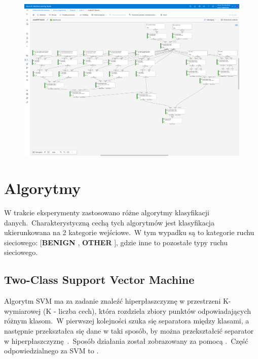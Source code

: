 \begin{landscape}
    \centering
\begin{figure}[H]
    \centering
    \includegraphics[height=0.9\textwidth]{images/pipeline}
    \label{fig:pipeline}
\end{figure}
\end{landscape}

\section{Algorytmy}
\label{sec:alg}
W trakcie eksperymenty zastosowano różne algorytmy klasyfikacji danych.\ Charakterystyczną cechą tych algorytmów jest klasyfikacja ukierunkowana na 2 kategorie wejściowe.\ W tym wypadku są to kategorie ruchu sieciowego: [\textbf{BENIGN} , \textbf{OTHER} ], gdzie inne to pozostałe typy ruchu sieciowego.

\subsection{Two-Class Support Vector Machine}
Algorytm SVM ma za zadanie znaleźć hiperpłaszczyznę w przestrzeni K-wymiarowej (K - liczba cech), która rozdziela zbiory punktów odpowiadających różnym klasom.\ W pierwszej kolejności szuka się separatora między klasami, a następnie przekształca się dane w taki sposób, by można przekształcić separator w hiperpłaszczyznę~\cite{IBM}.\ Sposób działania został zobrazowany za pomocą .\ Część  odpowiedzialnego za SVM to .

